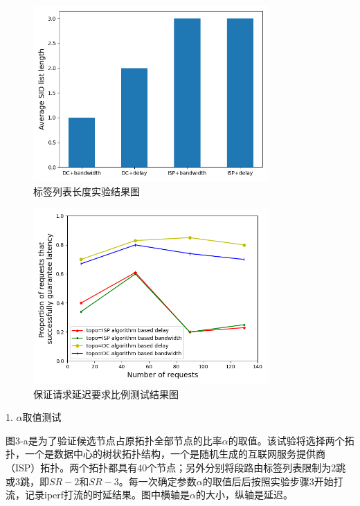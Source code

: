 \begin{figure}[htbp]
\setlength{\abovecaptionskip}{15pt plus 3pt minus 2pt}
\centerline{\includegraphics[width=0.8\textwidth]{./figures/ch3-test-3.png}}
\caption{标签列表长度实验结果图}
\label{fig-ch3-test-3}
\end{figure}

\begin{figure}[htbp]
\setlength{\abovecaptionskip}{15pt plus 3pt minus 2pt}
\centerline{\includegraphics[width=0.8\textwidth]{./figures/ch3-test-4.png}}
\caption{保证请求延迟要求比例测试结果图}
\label{fig-ch3-test-4}
\end{figure}

1. $\alpha$取值测试

图3-a是为了验证候选节点占原拓扑全部节点的比率$\alpha$的取值。该试验将选择两个拓扑，一个是数据中心的树状拓扑结构，一个是随机生成的互联网服务提供商（ISP）拓扑。两个拓扑都具有40个节点；另外分别将段路由标签列表限制为2跳或3跳，即$SR-2$和$SR-3$。每一次确定参数$\alpha$的取值后后按照实验步骤3开始打流，记录iperf打流的时延结果。图中横轴是$\alpha$的大小，纵轴是延迟。

